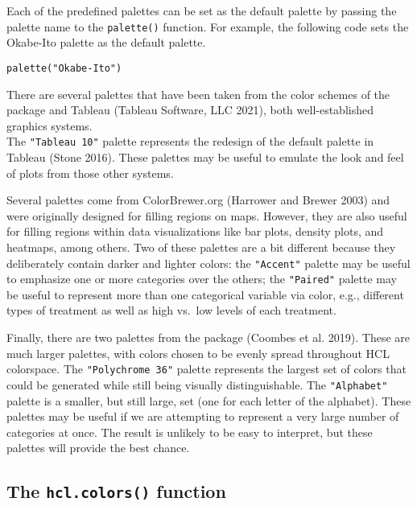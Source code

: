Each of the predefined palettes can be set as the default palette by passing
the palette name to the \texttt{palette()} function. For example,
the following code sets the Okabe-Ito palette as the default palette.

\begin{verbatim}
palette("Okabe-Ito")
\end{verbatim}

There are several palettes that have been taken from the color schemes of
the  package and Tableau (Tableau Software, LLC 2021), both
well-established graphics systems.\\
The \texttt{"Tableau\ 10"} palette
represents the redesign of the default palette in Tableau (Stone 2016).
These palettes may be useful
to emulate the look and feel of plots from those other systems.

Several palettes come from ColorBrewer.org (Harrower and Brewer 2003) and
were originally designed for filling regions on maps. However, they
are also useful for filling regions within data visualizations like bar plots,
density plots, and heatmaps, among others.
Two of these palettes are a bit different because
they deliberately contain darker and lighter colors:
the \texttt{"Accent"} palette may be useful to emphasize one or more categories
over the others;
the \texttt{"Paired"} palette may be useful to represent more than one
categorical variable via color, e.g., different types of treatment
as well as high vs.~low levels of each treatment.

Finally, there are two palettes from the
 package (Coombes et al. 2019).
These are much larger palettes, with colors chosen to be evenly
spread throughout HCL colorspace. The \texttt{"Polychrome~36"} palette
represents the largest set of colors that could be generated
while still being visually distinguishable. The \texttt{"Alphabet"}
palette is a smaller, but still large, set (one for each letter
of the alphabet). These palettes
may be useful if we are attempting to represent a very large
number of categories at once. The result is unlikely to be
easy to interpret, but these palettes will provide the best chance.

\hypertarget{the-hcl.colors-function-1}{%
\subsection{\texorpdfstring{The \texttt{hcl.colors()} function}{The hcl.colors() function}}\label{the-hcl.colors-function-1}}

